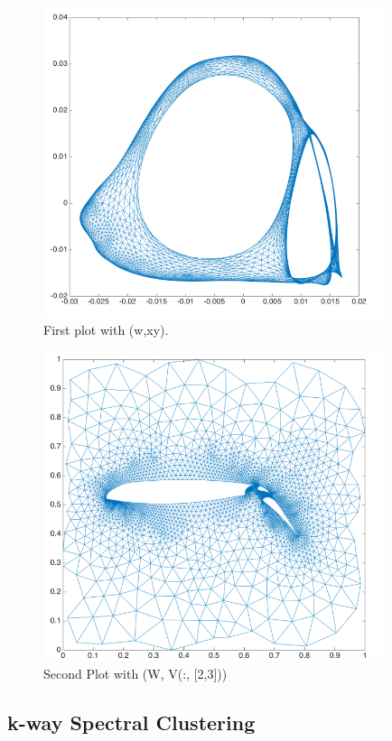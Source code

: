 \documentclass[unicode,11pt,a4paper,oneside,numbers=endperiod,openany]{scrartcl}
\begin{document}
\begin{figure}[H]
    \centering
    \includegraphics[trim=0cm 0cm 0cm 0cm, clip, width=10cm]{img1.png}
    \caption{First plot with (w,xy).}
    \label{fig:img2}
\end{figure}
\begin{figure}[H]
    \centering
    \includegraphics[trim=0cm 0cm 0cm 0cm, clip, width=10cm]{img2.png}
    \caption{Second Plot with (W, V(:, [2,3]))}
    \label{fig:img2}
\end{figure}

\subsection{k-way Spectral Clustering}
\end{document}
